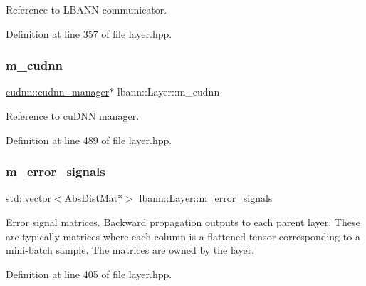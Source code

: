 Reference to L\+B\+A\+NN communicator. 

Definition at line 357 of file layer.\+hpp.

\mbox{\label{classlbann_1_1Layer_a08dbb94239e3b8c96329786c57c72e21}} 
\subsubsection{\texorpdfstring{m\+\_\+cudnn}{m\_cudnn}}
{\footnotesize\ttfamily \hyperlink{classlbann_1_1cudnn_1_1cudnn__manager}{cudnn\+::cudnn\+\_\+manager}$\ast$ lbann\+::\+Layer\+::m\+\_\+cudnn\hspace{0.3cm}{\ttfamily [protected]}}

Reference to cu\+D\+NN manager. 

Definition at line 489 of file layer.\+hpp.

\mbox{\label{classlbann_1_1Layer_a452e22ac81c1a799f0614b3e942ea726}} 
\subsubsection{\texorpdfstring{m\+\_\+error\+\_\+signals}{m\_error\_signals}}
{\footnotesize\ttfamily std\+::vector$<$\hyperlink{base_8hpp_a9a697a504ae84010e7439ffec862b470}{Abs\+Dist\+Mat}$\ast$$>$ lbann\+::\+Layer\+::m\+\_\+error\+\_\+signals\hspace{0.3cm}{\ttfamily [protected]}}

Error signal matrices. Backward propagation outputs to each parent layer. These are typically matrices where each column is a flattened tensor corresponding to a mini-\/batch sample. The matrices are owned by the layer. 

Definition at line 405 of file layer.\+hpp.

\mbox{\label{classlbann_1_1Layer_ac08f133dddd150319650e220ab9a523a}} 
